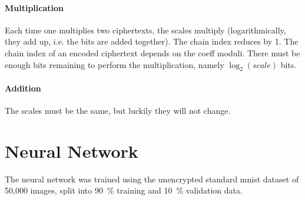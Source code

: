 
\paragraph{Multiplication}
Each time one multiplies two ciphertexts, the scales multiply (logarithmically, they add up, i.e. the bits are added together).
The chain index reduces by 1. The chain index of an encoded ciphertext depends on the coeff moduli.
There must be enough bits remaining to perform the multiplication, namely $\log_2(scale)$ bits.

\paragraph{Addition}
The scales must be the same, but luckily they will not change.



\section{Neural Network}
The neural network was trained using the unencrypted standard \gls{mnist} dataset of 50,000 images, split into \SI{90}{\percent} training and \SI{10}{\percent} validation data.

